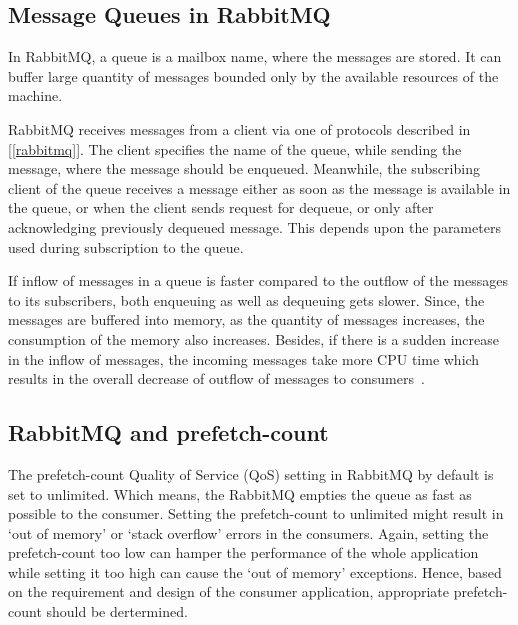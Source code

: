   \subsection{Message Queues in RabbitMQ}
  In RabbitMQ, a queue is a mailbox name, where the messages are stored. It can buffer large quantity of messages bounded only by the available resources of the machine.

  RabbitMQ receives messages from a client via one of protocols described in [\autoref{rabbitmq}]. The client specifies the name of the queue, while sending the message, where the message should be enqueued. Meanwhile, the subscribing client of the queue receives a message either as soon as the message is available in the queue, or when the client sends request for dequeue, or only after acknowledging previously dequeued message. This depends upon the parameters used during subscription to the queue.

  If inflow of messages in a queue is faster compared to the outflow of the messages to its subscribers, both enqueuing as well as dequeuing gets slower. Since, the messages are buffered into memory, as the quantity of messages increases, the consumption of the memory also increases. Besides, if there is a sudden increase in the inflow of messages, the incoming messages take more CPU time which results in the overall decrease of outflow of messages to consumers~\cite{sizingYourRabbits}.

  \subsection{RabbitMQ and prefetch-count}
  \label{sec:rabbitmq}
  The prefetch-count Quality of Service (QoS) setting in RabbitMQ by default is set to unlimited. Which means, the RabbitMQ empties the queue as fast as possible to the consumer. Setting the prefetch-count to unlimited might result in ‘out of memory’ or ‘stack overflow’ errors in the consumers. Again, setting the prefetch-count too low can hamper the performance of the whole application while setting it too high can cause the ‘out of memory’ exceptions. Hence, based on the requirement and design of the consumer application, appropriate prefetch-count should be dertermined.

